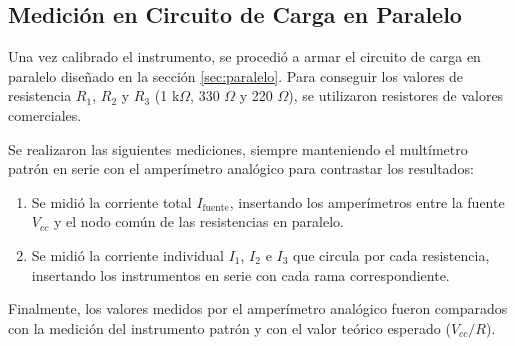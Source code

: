 \subsection{Medición en Circuito de Carga en Paralelo}

Una vez calibrado el instrumento, se procedió a armar el circuito de carga en paralelo diseñado en la sección \ref{sec:paralelo}. Para conseguir los valores de resistencia $R_1$, $R_2$ y $R_3$ (1 k$\Omega$, 330 $\Omega$ y 220 $\Omega$), se utilizaron resistores de valores comerciales.

Se realizaron las siguientes mediciones, siempre manteniendo el multímetro patrón en serie con el amperímetro analógico para contrastar los resultados:
\begin{enumerate}
    \item Se midió la corriente total $I_{\text{fuente}}$, insertando los amperímetros entre la fuente $V_{cc}$ y el nodo común de las resistencias en paralelo.
    \item Se midió la corriente individual $I_1$, $I_2$ e $I_3$ que circula por cada resistencia, insertando los instrumentos en serie con cada rama correspondiente.
\end{enumerate}

Finalmente, los valores medidos por el amperímetro analógico fueron comparados con la medición del instrumento patrón y con el valor teórico esperado ($V_{cc}/R$).


